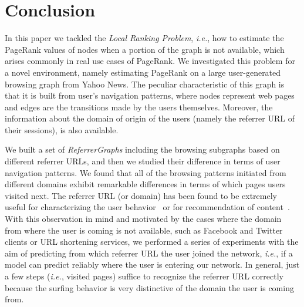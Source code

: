 \documentclass{sig-alternate-2013}
\newcommand{\ie}{\emph{i.e.}}
\begin{document}
\section{Conclusion} \label{sec:conclusions}
In this paper we tackled the {\it Local Ranking Problem}, \ie, how to estimate
the PageRank values of nodes when a portion of the graph is not available, which
arises commonly in real use cases of PageRank. We investigated this problem for
a novel environment, namely estimating PageRank on a large user-generated browsing
graph from Yahoo News.
The peculiar characteristic of this graph is that it is
built from user's navigation patterns, where nodes represent
web pages and edges are the transitions made by the users themselves. Moreover, the
information about the domain of origin of the users (namely the referrer URL of
their sessions), is also available.

We built a set of \textit{ReferrerGraphs} including the browsing subgraphs based on different referrer URLs, and then we studied their difference in terms of user navigation patterns. 
We found that all of the browsing patterns initiated from different domains exhibit remarkable differences in terms of which pages users visited next. 
The referrer URL (or domain) has been found to be extremely useful for characterizing the user behavior~\cite{chiarandini12discovering} or for recommendation of content~\cite{TrevisiolRecSys14}.
With this observation in mind and motivated by the cases where the domain from where the user is coming is not
available, such as Facebook and Twitter clients or URL shortening services, we performed a series of experiments with the aim of predicting from which
referrer URL the user joined the network, \ie, if a model can predict reliably
where the user is entering our network. In general, just a few steps (\ie,
visited pages) suffice to recognize the referrer URL
correctly because the surfing behavior is very distinctive of the domain the user is
coming from. 
 
\end{document}
